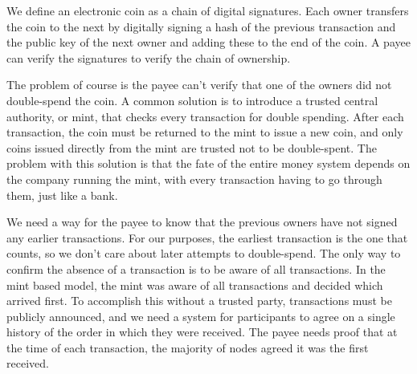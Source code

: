 We define an electronic coin as a chain of digital signatures. Each owner transfers the coin to the next by digitally signing a hash of the previous transaction and the public key of the next owner and adding these to the end of the coin. A payee can verify the signatures to verify the chain of ownership.

The problem of course is the payee can't verify that one of the owners did not double-spend the coin. A common solution is to introduce a trusted central authority, or mint, that checks every transaction for double spending. After each transaction, the coin must be returned to the mint to issue a new coin, and only coins issued directly from the mint are trusted not to be double-spent. The problem with this solution is that the fate of the entire money system depends on the company running the mint, with every transaction having to go through them, just like a bank.

We need a way for the payee to know that the previous owners have not signed any earlier transactions. For our purposes, the earliest transaction is the one that counts, so we don't care about later attempts to double-spend. The only way to confirm the absence of a transaction is to be aware of all transactions. In the mint based model, the mint was aware of all transactions and decided which arrived first. To accomplish this without a trusted party, transactions must be publicly announced, and we need a system for participants to agree on a single history of the order in which they were received. The payee needs proof that at the time of each transaction, the majority of nodes agreed it was the first received.